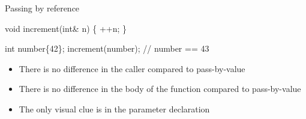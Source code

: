 \begin{frame}[fragile]{Passing by reference}

  \begin{codeblock}
void increment(int\alert{&} n) \{
  ++\alert{n};
\}

int number\{42\};
increment(\alert{number});
// number == 43\end{codeblock}

  \begin{itemize}
  \item There is no difference in the caller compared to pass-by-value
  \item There is no difference in the body of the function compared to pass-by-value
  \item The only visual clue is in the parameter declaration
  \end{itemize}

\end{frame}

